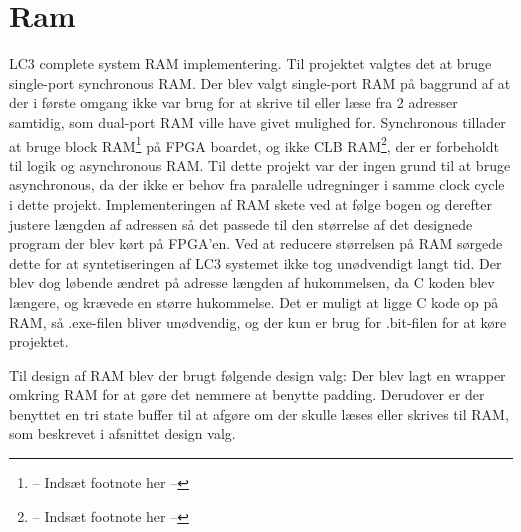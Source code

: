 \section{Ram}
LC3 complete system RAM implementering.
Til projektet valgtes det at bruge single-port synchronous RAM. Der blev valgt single-port RAM på baggrund af at der i første omgang ikke var brug for at skrive til eller læse fra 2 adresser samtidig, som dual-port RAM ville have givet mulighed for. Synchronous tillader at bruge block RAM\footnote{-- Indsæt footnote her --} på FPGA boardet, og ikke CLB RAM\footnote{-- Indsæt footnote her --}, der er forbeholdt til logik og asynchronous RAM. Til dette projekt var der ingen grund til at bruge asynchronous, da der ikke er behov fra paralelle udregninger i samme clock cycle i dette projekt. Implementeringen af RAM skete ved at følge bogen %
og derefter justere længden af adressen så det passede til den størrelse af det designede program der blev kørt på FPGA'en. Ved at reducere størrelsen på RAM sørgede dette for at syntetiseringen af LC3 systemet ikke tog unødvendigt langt tid. Der blev dog løbende ændret på adresse længden af hukommelsen, da C koden blev længere, og krævede en større hukommelse. Det er muligt at ligge C kode op på RAM, så .exe-filen bliver unødvendig, og der kun er brug for .bit-filen for at køre projektet.

Til design af RAM blev der brugt følgende design valg: Der blev lagt en wrapper omkring RAM for at gøre det nemmere at benytte padding. Derudover er der benyttet en tri state buffer til at afgøre om der skulle læses eller skrives til RAM, som beskrevet i afsnittet design valg.
